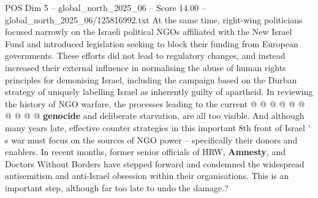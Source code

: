 \begin{textsample}{POS Dim 5 – global\_north\_2025\_06 – Score 14.00 – global\_north\_2025\_06/125816992.txt}
At the same time, right-wing politicians focused narrowly on the Israeli political NGOs affiliated with the New Israel Fund and introduced legislation seeking to block their funding from European governments.
These efforts did not lead to regulatory changes, and instead increased their external influence in normalising the abuse of human rights principles for demonising Israel, including the campaign based on the Durban strategy of uniquely labelling Israel as inherently guilty of apartheid.
In reviewing the history of NGO warfare, the processes leading to the current @ @ @ @ @ @ @ @ @ @ \textbf{genocide} and deliberate starvation, are all too visible.
And although many years late, effective counter strategies in this important 8th front of Israel ' s war must focus on the sources of NGO power -- specifically their donors and enablers.
In recent months, former senior officials of HRW, \textbf{Amnesty}, and Doctors Without Borders have stepped forward and condemned the widespread antisemitism and anti-Israel obsession within their organisations.
This is an important step, although far too late to undo the damage.?

\end{textsample}
